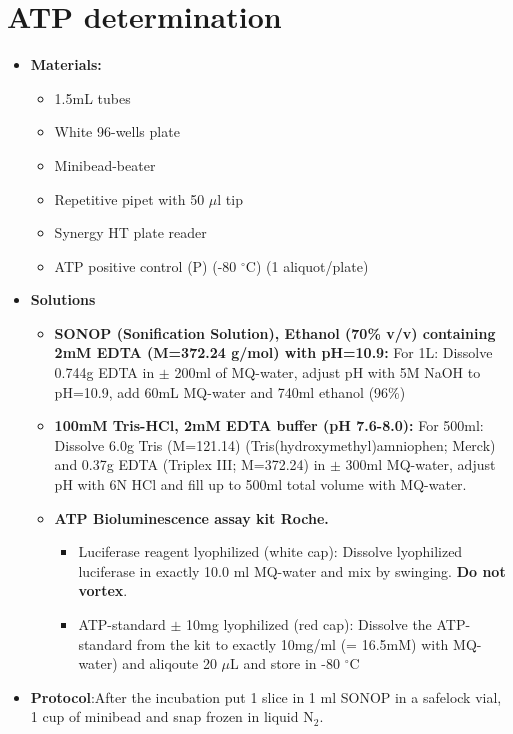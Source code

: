 \documentclass{EU-report}
\begin{document}
\section{ATP determination}
\label{atp}
\begin{itemize}
\item \textbf{Materials:}
\begin{itemize}
\item 1.5mL tubes
\item White 96-wells plate
\item Minibead-beater
\item Repetitive pipet with 50 $\mu$l tip
\item Synergy HT plate reader
\item ATP positive control (P) (-80 $^{\circ}$C) (1 aliquot/plate)
\end{itemize}
\item \textbf{Solutions}
\begin{itemize}
\item \textbf{SONOP (Sonification Solution), Ethanol (70\% v/v) containing 2mM EDTA (M=372.24 g/mol) with pH=10.9:}
For 1L: Dissolve 0.744g EDTA in $\pm$ 200ml of MQ-water, adjust pH with 5M NaOH to pH=10.9, add 60mL MQ-water and 740ml ethanol (96\%)
\item \textbf{100mM Tris-HCl, 2mM EDTA buffer (pH 7.6-8.0):} For 500ml: Dissolve 6.0g Tris (M=121.14) (Tris(hydroxymethyl)amniophen; Merck) and 0.37g EDTA (Triplex III; M=372.24) in $\pm$ 300ml MQ-water, adjust pH with 6N HCl and fill up to 500ml total volume with MQ-water.
\item \textbf{ATP Bioluminescence assay kit Roche.}
\begin{itemize}
\item Luciferase reagent lyophilized (white cap):
Dissolve lyophilized luciferase in exactly 10.0 ml MQ-water and mix by swinging. \textbf{Do not vortex}.
\item ATP-standard $\pm$ 10mg lyophilized (red cap):
 Dissolve the ATP-standard from the kit to exactly 10mg/ml (= 16.5mM) with MQ-water) and aliqoute 20 $\mu$L and store in -80 $^{\circ}$C
\end{itemize}
\end{itemize}
\item \textbf{Protocol}:After the incubation put 1 slice in 1 ml SONOP in a safelock vial, 1 cup of minibead and snap frozen in liquid N$_2$.
\begin{enumerate}

\end{enumerate}
\end{itemize}
\end{document}
